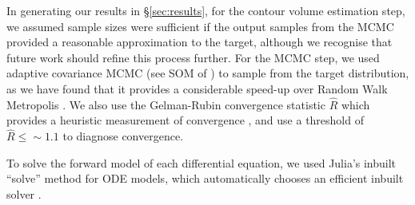 In generating our results in \S\ref{sec:results}, for the contour volume estimation step, we assumed sample sizes were sufficient if the output samples from the MCMC provided a reasonable approximation to the target, although we recognise that future work should refine this process further. For the MCMC step, we used adaptive covariance MCMC (see SOM of \cite{johnstone2016uncertainty}) to sample from the target distribution, as we have found that it provides a considerable speed-up over Random Walk Metropolis \cite{metropolis1953equation,lambert2018Student}. We also use the Gelman-Rubin convergence statistic $\hat{R}$ which provides a heuristic measurement of convergence \cite{lambert2018Student,gelman1992inference}, and use a threshold of $\hat{R}\leq\sim 1.1$ to diagnose convergence.

To solve the forward model of each differential equation, we used Julia's inbuilt ``solve'' method for ODE models, which automatically chooses an efficient inbuilt solver \cite{bezanson2017julia}.
